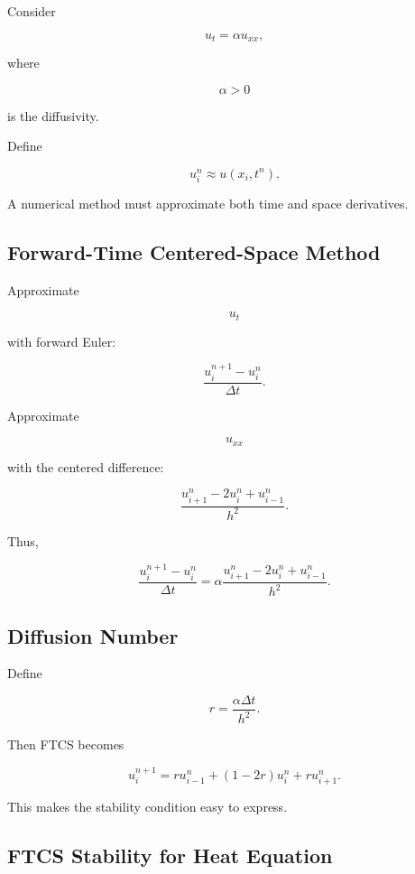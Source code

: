 Consider

\[
\boxed{
u_t
=
\alpha u_{xx},
}
\]

where

\[
\alpha>0
\]

is the diffusivity.

Define

\[
\boxed{
u_i^n
\approx
u(x_i,t^n).
}
\]

A numerical method must approximate both time and space derivatives.

\subsection{Forward-Time Centered-Space Method}
\label{subsec:ftcs-heat}

Approximate

\[
u_t
\]

with forward Euler:

\[
\frac{
u_i^{n+1}-u_i^n
}{
\Delta t
}.
\]

Approximate

\[
u_{xx}
\]

with the centered difference:

\[
\frac{
u_{i+1}^n
-
2u_i^n
+
u_{i-1}^n
}{
h^2
}.
\]

Thus,

\[
\boxed{
\frac{
u_i^{n+1}-u_i^n
}{
\Delta t
}
=
\alpha
\frac{
u_{i+1}^n
-
2u_i^n
+
u_{i-1}^n
}{
h^2
}.
}
\]

\subsection{Diffusion Number}
\label{subsec:diffusion-number}

Define

\[
\boxed{
r
=
\frac{
\alpha\Delta t
}{
h^2
}.
}
\]

Then FTCS becomes

\[
\boxed{
u_i^{n+1}
=
r u_{i-1}^n
+
(1-2r)u_i^n
+
r u_{i+1}^n.
}
\]

This makes the stability condition easy to express.

\subsection{FTCS Stability for Heat Equation}
\label{subsec:ftcs-heat-stability}

